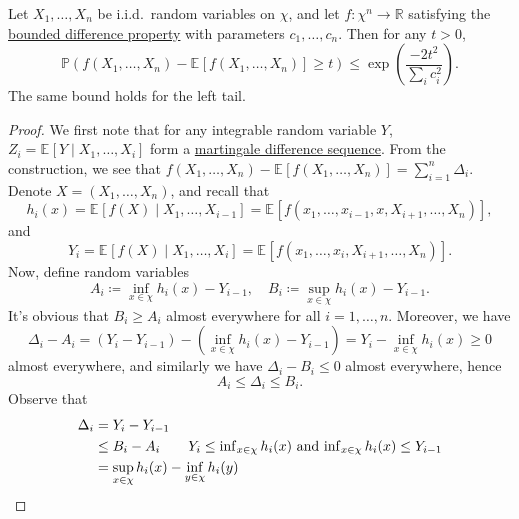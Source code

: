 \begin{theorem}\label{pf-thm:McDiarmid-inequality}
	Let \(X_1, \dots , X_n\) be i.i.d.\ random variables on \(\chi \), and let \(f\colon \chi ^n \to \mathbb{R} \) satisfying the \hyperref[def:bounded-difference-property]{bounded difference property} with parameters \(c_1, \dots , c_n\). Then for any \(t > 0\),
	\[
		\mathbb{P} (f(X_1, \dots , X_n) - \mathbb{E}_{}\left[f (X_1, \dots , X_n)\right] \geq t) \leq \exp \left( \frac{-2t^2}{\sum_{i} c_i^2} \right).
	\]
	The same bound holds for the left tail.
\end{theorem}
\begin{proof}
	We first note that for any integrable random variable \(Y\), \(Z_i = \mathbb{E}_{}\left[Y \mid X_1, \dots , X_i \right] \) form a \hyperref[def:martingale-difference-sequence]{martingale difference sequence}. From the construction, we see that \(f(X_1, \dots , X_n) - \mathbb{E}_{}\left[f(X_1, \dots , X_n) \right] = \sum_{i=1}^{n} \Delta _{i}\). Denote \(X = (X_1, \dots , X_n)\), and recall that
	\[
		h_i(x)
		= \mathbb{E}_{}\left[f(X) \mid X_1, \dots , X_{i-1} \right]
		= \mathbb{E}_{}\left[f(x_1, \dots , x_{i-1}, x, X_{i+1}, \dots , X_n) \right],
	\]
	and
	\[
		Y_i
		= \mathbb{E}_{}\left[f(X) \mid X_1, \dots , X_i \right]
		= \mathbb{E}_{}\left[f(x_1, \dots , x_i, X_{i+1}, \dots , X_n) \right].
	\]
	Now, define random variables
	\[
		A_i \coloneqq \inf _{x\in \chi } h_i(x) - Y_{i-1} ,\quad
		B_i \coloneqq \sup _{x\in \chi } h_i(x) - Y_{i-1} .
	\]
	It's obvious that \(B_i \geq A_i\) almost everywhere for all \(i = 1, \dots , n\). Moreover, we have
	\[
		\Delta _i - A_i
		= (Y_i - Y_{i-1}) - (\inf _{x\in \chi } h_i(x) - Y_{i-1} )
		= Y_i - \inf _{x\in \chi } h_i(x) \geq 0
	\]
	almost everywhere, and similarly we have \(\Delta _i - B_i \leq 0\) almost everywhere, hence
	\[
		A_i \leq \Delta _i \leq B_i.
	\]
	Observe that
	\begin{align*}
		\Delta _i
		 & = Y_i - Y_{i-1}                                                                                                                                                                    \\
		 & \leq B_i - A_i \tag*{\(Y_i \leq \inf _{x\in \chi } h_i(x)\) and \(\inf _{x\in \chi } h_i(x) \leq Y_{i-1} \)}                                                                       \\
		 & = \sup _{x\in \chi } h_i(x) - \inf _{y\in \chi } h_i(y)                                                                                                                            \\

\end{align*}
\end{proof}
